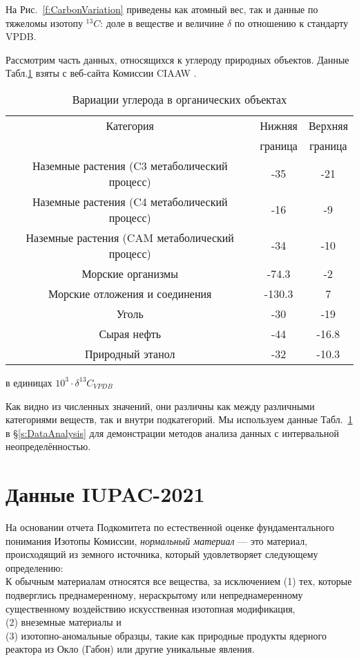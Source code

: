 \documentclass[a5paper,openany]{book}
\begin{document}
На Рис.~\ref{f:CarbonVariation} приведены как атомный вес, так и данные по тяжеломы изотопу $^{13}C$: доле в веществе и величине  $\delta$ по отношению к стандарту VPDB.

Рассмотрим часть данных, относящихся к углероду природных объектов. Данные Табл.\ref{t:OrganicCarbonVariation} взяты  с веб-сайта Комиссии CIAAW \cite{CIAAWnaturalVariation}.

\begin{table}[h!]
	\begin{center}
	{\small
		\begin{tabular}{ccc}
			\hline
			Категория & Нижняя & Верхняя \\
			~ & граница & граница \\ 
			\hline
			Наземные растения (C3 метаболический процесс)	& -35 & -21 \\
			Наземные растения (C4 метаболический процесс)	& -16 & -9 \\
			Наземные растения  (CAM метаболический процесс)	& -34 & -10 \\
			\hline
			Морские организмы 	& -74.3 & -2 \\
			Морские отложения и соединения &	-130.3 & 7 \\
			\hline
			Уголь &	-30 & -19 \\
			Сырая нефть &	-44 & -16.8 \\
			Природный этанол & -32 &  -10.3 \\
			\hline
		\end{tabular}
	}
	\caption{Вариации углерода в органических объектах} в единицах $10^3 \cdot \delta ^{13}C_{VPDB}$
	\label{t:OrganicCarbonVariation}
	\end{center}
\end{table}

Как видно из численных значений, они различны как между различными категориями веществ, так и внутри подкатегорий. Мы используем данные Табл.~\ref{t:OrganicCarbonVariation} в \S\ref{s:DataAnalysis} для демонстрации методов анализа данных с интервальной неопределённостью.



\section{Данные IUPAC-2021}

На основании отчета Подкомитета по естественной оценке фундаментального понимания
Изотопы Комиссии, \emph{нормальный материал} — это материал, происходящий из земного источника, который
удовлетворяет следующему определению: \\ 
К обычным материалам относятся все вещества, за исключением 
(1) тех, которые подверглись преднамеренному, нераскрытому или непреднамеренному существенному воздействию искусственная изотопная модификация, \\
(2) внеземные материалы и \\
(3) изотопно-аномальные образцы, такие как природные продукты ядерного реактора из Окло (Габон) или другие уникальные явления.
\end{document}
